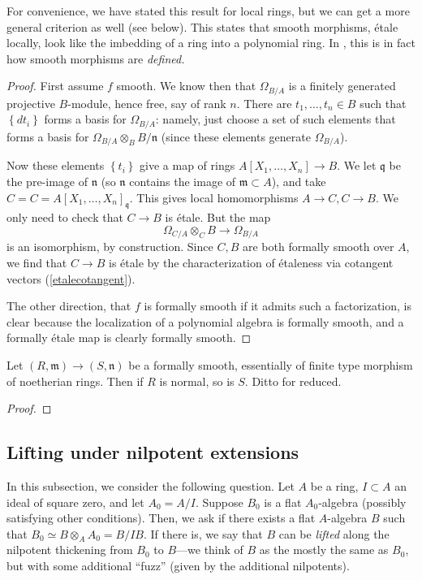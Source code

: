 For convenience, we have stated this result for local rings, but we can get a
more general criterion as well (see below). This states that smooth
morphisms, \'etale locally, look like the imbedding of a ring into a
polynomial ring.
In \cite{SGA1}, this is in fact how smooth morphisms are \emph{defined.}

\begin{proof} First assume $f$ smooth.
We know then that $\Omega_{B/A}$ is a finitely generated projective $B$-module,
hence free, say of rank $n$. 
There are $t_1, \dots, t_n \in B$ such that $\left\{dt_i\right\}$ forms a basis
for $\Omega_{B/A}$: namely, just choose a set of such elements that forms a
basis for $\Omega_{B/A} \otimes_B B/\mathfrak{n}$ (since these elements
generate $\Omega_{B/A}$).

Now these elements $\left\{t_i\right\}$ give a map of rings $A[X_1, \dots, X_n]
\to B$. We let $\mathfrak{q}$ be the pre-image of $\mathfrak{n}$ (so
$\mathfrak{n}$ contains the image of $\mathfrak{m} \subset A$), and take $C =
C = A[X_1,\dots, X_n]_{\mathfrak{q}}$. This gives local homomorphisms $A \to C,
C \to B$. We only need to check that $C \to B$ is \'etale. 
But the map
\[ \Omega_{C/A} \otimes_C B \to \Omega_{B/A}  \]
is an isomorphism, by construction. Since $C, B$ are both formally smooth over
$A$, we find that $C \to B$ is \'etale by the characterization of \'etaleness
via cotangent vectors
(\cref{etalecotangent}).

The other direction, that $f$ is formally smooth if it admits such a
factorization, is clear because the localization of a polynomial algebra is
formally smooth, and a formally \'etale map is clearly formally smooth.
\end{proof} 

\begin{corollary} 
Let $(R, \mathfrak{m}) \to (S, \mathfrak{n})$ be a formally smooth, essentially
of finite type morphism of noetherian rings. Then if $R$ is normal, so is $S$.
Ditto for reduced.
\end{corollary} 
\begin{proof} 

\end{proof} 

\subsection{Lifting under nilpotent extensions}

In this subsection, we consider the following question. Let $A$ be a ring, $I
\subset A$ an ideal of square zero, and let $A_0 = A/I$. Suppose $B_0$ is a
flat $A_0$-algebra (possibly satisfying other conditions).
Then, we ask if there exists a flat $A$-algebra $B$ such that $B_0 \simeq B
\otimes_A A_0 = B/IB$.
If there is, we say that $B$ can be \emph{lifted} along the nilpotent
thickening from $B_0$ to $B$---we think of $B$ as the mostly the same as $B_0$,
but with some additional ``fuzz'' (given by the additional nilpotents).

